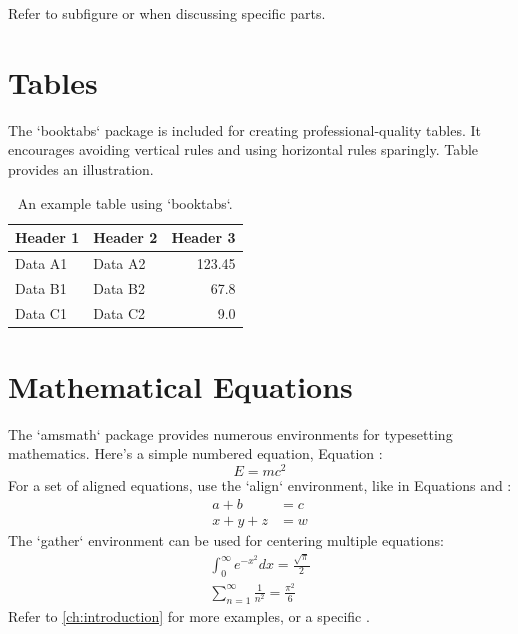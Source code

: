 Refer to subfigure  or  when discussing specific parts.

\section{Tables}
\label{sec:tables}

The `booktabs` package is included for creating professional-quality tables. It encourages avoiding vertical rules and using horizontal rules sparingly.
Table  provides an illustration.

\begin{table}[htbp]
    \centering
    \caption{An example table using `booktabs`.}
    \label{tab:example_table}
    \begin{tabular}{@{}llr@{}} %
        \toprule
        Header 1 & Header 2 & Header 3 \\
        \midrule
        Data A1  & Data A2  & 123.45   \\
        Data B1  & Data B2  & 67.8     \\
        Data C1  & Data C2  & 9.0      \\
        \bottomrule
    \end{tabular}
\end{table}

\section{Mathematical Equations}
\label{sec:equations}

The `amsmath` package provides numerous environments for typesetting mathematics.
Here's a simple numbered equation, Equation :
\begin{equation}
    E = mc^2
    \label{eq:einstein}
\end{equation}
For a set of aligned equations, use the `align` environment, like in Equations  and :
\begin{align}
    a + b &= c \label{eq:align_start} \\
    x + y + z &= w \label{eq:align_end}
\end{align}
The `gather` environment can be used for centering multiple equations:
\begin{gather}
    \int_0^\infty e^{-x^2} dx = \frac{\sqrt{\pi}}{2} \label{eq:gaussian_integral} \\
    \sum_{n=1}^\infty \frac{1}{n^2} = \frac{\pi^2}{6} \label{eq:basel_problem}
\end{gather}
Refer to \cref{ch:introduction} for more examples, or a specific .

